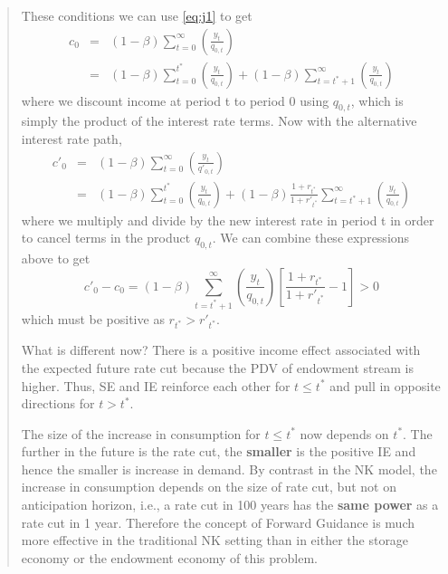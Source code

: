 \begin{exercise}
\begin{quote}
\begin{enumerate}
These conditions we can use \eqref{eq:j1} to get
\begin{eqnarray*}
\label{eq:c_0_endowment}
c_0 &=& 
 (1-\beta)   \sum_{t=0}^{\infty} 
\left(\frac{y_{t}}{q_{0,t}} \right)
\\&=& 
 (1-\beta)   \sum_{t=0}^{t^*} 
\left(\frac{y_{t}}{q_{0,t}} \right)
+ (1-\beta)   \sum_{t=t^*+1}^{\infty} 
\left(\frac{y_{t}}{q_{0,t}} \right)
\end{eqnarray*}
where we discount income at period t to period 0 using $q_{0,t}$, which is simply the product of the interest rate terms. Now with the alternative interest rate path,
\begin{eqnarray*}
\label{eq:c'_0_endowment}
c'_0 &=&  (1-\beta)  \sum_{t=0}^{\infty} 
\left(
\frac{y_{t} }
{q'_{0,t}} 
\right)\\
&=& 
 (1-\beta)   \sum_{t=0}^{t^*} 
\left(\frac{y_{t}}{q_{0,t}} \right)
+ (1-\beta) \frac{1+r_{t^*}}{1+r'_{t^*}}
  \sum_{t=t^*+1}^{\infty} 
\left(\frac{y_{t}}{q_{0,t}} \right)
\end{eqnarray*}
where we multiply and divide by the new interest rate in period t in order to cancel terms in the product $q_{0,t}$. We can combine these expressions above to get
\[
c'_0 - c_0 = (1-\beta)  \sum_{t=t^*+1}^{\infty} 
\left(\frac{y_{t}}{q_{0,t}} \right) \left[\frac{1+r_{t^*}}{1+r'_{t^*}} -1\right]
>0\]
which must be positive as $r_{t^*}>r'_{t^*}$.

What is different now? There is a positive income effect associated with the expected future rate cut because the PDV of endowment stream is higher. Thus, SE and IE reinforce each other for $t\le t^*$ and pull in opposite directions for $t>t^*$. 

The size of the increase in consumption for $t \le t^*$ now depends on $t^*$. The further in the future is the rate cut, the {\bf smaller} is the positive IE and hence the smaller is increase in demand. By contrast in the NK model, the increase in consumption depends on the size of rate cut, but not on anticipation horizon, i.e., a rate cut in 100 years has the {\bf same power} as a rate cut in 1 year. Therefore the concept of Forward Guidance is much more effective in the traditional NK setting than in either the storage economy or the endowment economy of this problem.

\end{enumerate}
\end{quote}
\end{exercise}

